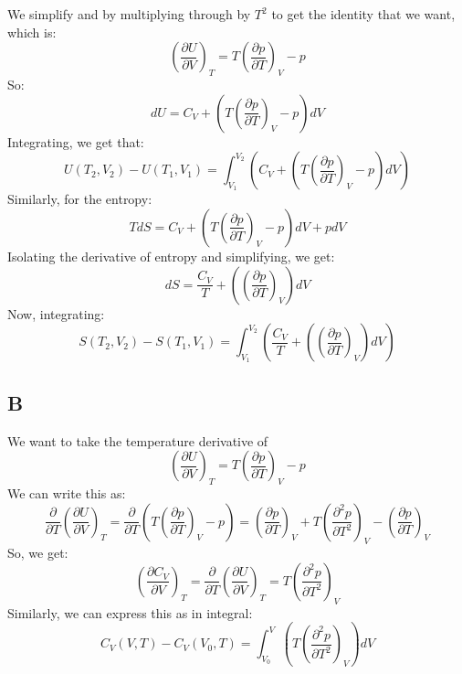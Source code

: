 \documentclass{article}
\begin{document}
We simplify and by multiplying through by $T^2$ to get the identity that we want, which is:
\begin{equation}
    \left( \frac{\partial U}{\partial V} \right)_T = T \left( \frac{\partial p}{\partial T} \right)_V - p
\end{equation}
So:
\begin{equation}
    dU = C_{V} + \left( T \left( \frac{\partial p}{\partial T} \right)_V - p \right) dV
\end{equation}
Integrating, we get that:
\begin{equation}
    U(T_{2}, V_{2}) - U(T_{1}, V_{1}) = \int_{V_{1}}^{V_{2}} \left( C_{V} + \left( T \left( \frac{\partial p}{\partial T} \right)_V - p \right) dV \right)
\end{equation}
Similarly, for the entropy:
\begin{equation}
   T dS = C_{V} + \left( T \left( \frac{\partial p}{\partial T} \right)_V - p \right) dV + p dV 
\end{equation}
Isolating the derivative of entropy and simplifying, we get:
\begin{equation}
    dS = \frac{C_{V}}{T} + \left( \left( \frac{\partial p}{\partial T} \right)_V \right) dV
\end{equation}
Now, integrating:
\begin{equation}
    S(T_{2}, V_{2}) - S(T_{1}, V_{1}) = \int_{V_{1}}^{V_{2}} \left( \frac{C_{V}}{T} + \left( \left( \frac{\partial p}{\partial T} \right)_V \right) dV \right)
\end{equation}
\subsection{B}
We want to take the temperature derivative of
\begin{equation}
    \left( \frac{\partial U}{\partial V} \right)_T = T \left( \frac{\partial p}{\partial T} \right)_V - p
\end{equation}
We can write this as:
\begin{equation}
    \frac{\partial }{\partial T} \left( \frac{\partial U}{\partial V} \right)_T = \frac{\partial }{\partial T} \left( T \left( \frac{\partial p}{\partial T} \right)_V - p \right)= \left( \frac{\partial p}{\partial T} \right)_V + T \left( \frac{\partial^2 p}{\partial T^2} \right)_V - \left( \frac{\partial p}{\partial T} \right)_V 
\end{equation}
So, we get:
\begin{equation}
    \left(\frac{\partial C_{V}}{\partial V} \right)_T = \frac{\partial }{\partial T} \left( \frac{\partial U}{\partial V} \right)_T = T \left( \frac{\partial^2 p}{\partial T^2} \right)_V
\end{equation}
Similarly, we can express this as in integral:
\begin{equation}
    C_{V}(V, T) - C_{V}(V_{0},T) = \int_{V_{0}}^{V} \left( T \left( \frac{\partial^2 p}{\partial T^2} \right)_V \right) dV
\end{equation}
\end{document}
